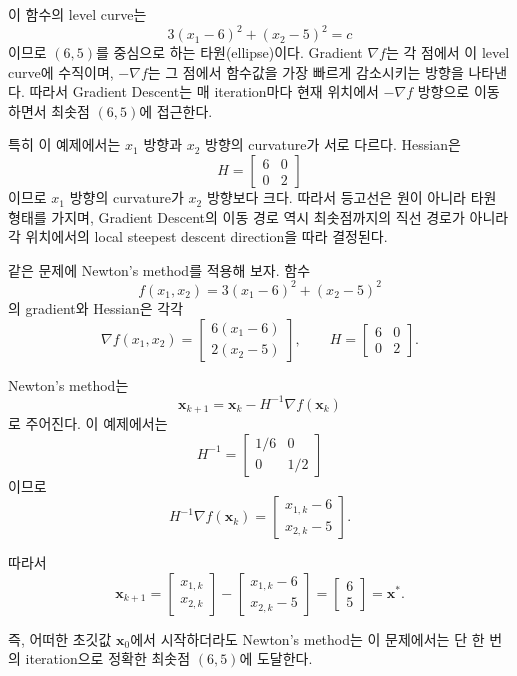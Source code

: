 \documentclass[11pt,a4paper]{article}
\begin{document}
이 함수의 level curve는
\[
3(x_1-6)^2+(x_2-5)^2=c
\]
이므로 $(6,5)$를 중심으로 하는 타원(ellipse)이다.
Gradient $\nabla f$는 각 점에서 이 level curve에 수직이며,
$-\nabla f$는 그 점에서 함수값을 가장 빠르게 감소시키는 방향을 나타낸다.
따라서 Gradient Descent는 매 iteration마다 현재 위치에서
$-\nabla f$ 방향으로 이동하면서 최솟점 $(6,5)$에 접근한다.

특히 이 예제에서는 $x_1$ 방향과 $x_2$ 방향의 curvature가 서로 다르다.
Hessian은
\[
H=
\begin{bmatrix}
6&0\\
0&2
\end{bmatrix}
\]
이므로 $x_1$ 방향의 curvature가 $x_2$ 방향보다 크다.
따라서 등고선은 원이 아니라 타원 형태를 가지며,
Gradient Descent의 이동 경로 역시 최솟점까지의 직선 경로가 아니라
각 위치에서의 local steepest descent direction을 따라 결정된다.

같은 문제에 Newton's method를 적용해 보자. 함수
\[
f(x_1,x_2)=3(x_1-6)^2+(x_2-5)^2
\]
의 gradient와 Hessian은 각각
\[
\nabla f(x_1,x_2)
=
\begin{bmatrix}
6(x_1-6)\\
2(x_2-5)
\end{bmatrix},
\qquad
H=
\begin{bmatrix}
6&0\\
0&2
\end{bmatrix}.
\]

Newton's method는
\[
\mathbf{x}_{k+1}
=
\mathbf{x}_k-H^{-1}\nabla f(\mathbf{x}_k)
\]
로 주어진다. 이 예제에서는
\[
H^{-1}
=
\begin{bmatrix}
1/6&0\\
0&1/2
\end{bmatrix}
\]
이므로
\[
H^{-1}\nabla f(\mathbf{x}_k)
=
\begin{bmatrix}
x_{1,k}-6\\
x_{2,k}-5
\end{bmatrix}.
\]

따라서
\[
\mathbf{x}_{k+1}
=
\begin{bmatrix}
x_{1,k}\\
x_{2,k}
\end{bmatrix}
-
\begin{bmatrix}
x_{1,k}-6\\
x_{2,k}-5
\end{bmatrix}
=
\begin{bmatrix}
6\\
5
\end{bmatrix} = \mathbf{x}^*.
\]

즉, 어떠한 초깃값 $\mathbf{x}_0$에서 시작하더라도 Newton's method는
이 문제에서는 단 한 번의 iteration으로 정확한 최솟점 $(6,5)$에 도달한다.
\end{document}
